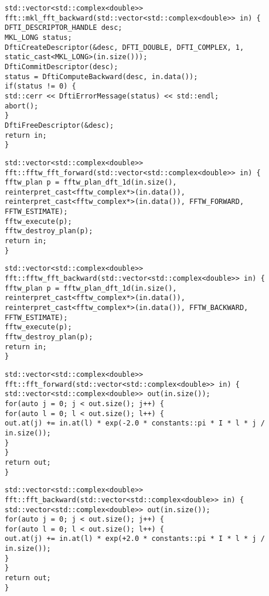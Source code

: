 \begin{lstlisting}[style=CXX, caption=Function performing backward fast Fourier transform using MKL library]
std::vector<std::complex<double>> fft::mkl_fft_backward(std::vector<std::complex<double>> in) {
DFTI_DESCRIPTOR_HANDLE desc;
MKL_LONG status;
DftiCreateDescriptor(&desc, DFTI_DOUBLE, DFTI_COMPLEX, 1, static_cast<MKL_LONG>(in.size()));
DftiCommitDescriptor(desc);
status = DftiComputeBackward(desc, in.data());
if(status != 0) {
std::cerr << DftiErrorMessage(status) << std::endl;
abort();
}
DftiFreeDescriptor(&desc);
return in;
}
\end{lstlisting}

\begin{lstlisting}[style=CXX, caption=Function performing forward fast Fourier transform using FFTW library]
std::vector<std::complex<double>> fft::fftw_fft_forward(std::vector<std::complex<double>> in) {
fftw_plan p = fftw_plan_dft_1d(in.size(), reinterpret_cast<fftw_complex*>(in.data()), reinterpret_cast<fftw_complex*>(in.data()), FFTW_FORWARD, FFTW_ESTIMATE);
fftw_execute(p);
fftw_destroy_plan(p);
return in;
}
\end{lstlisting}

\begin{lstlisting}[style=CXX, caption=Function performing backward fast Fourier transform using FFTW library]
std::vector<std::complex<double>> fft::fftw_fft_backward(std::vector<std::complex<double>> in) {
fftw_plan p = fftw_plan_dft_1d(in.size(), reinterpret_cast<fftw_complex*>(in.data()), reinterpret_cast<fftw_complex*>(in.data()), FFTW_BACKWARD, FFTW_ESTIMATE);
fftw_execute(p);
fftw_destroy_plan(p);
return in;
}
\end{lstlisting}

\begin{lstlisting}[style=CXX, caption=Function performing forward discrete Fourier transform without using any library]
std::vector<std::complex<double>> fft::fft_forward(std::vector<std::complex<double>> in) {
std::vector<std::complex<double>> out(in.size());
for(auto j = 0; j < out.size(); j++) {
for(auto l = 0; l < out.size(); l++) {
out.at(j) += in.at(l) * exp(-2.0 * constants::pi * I * l * j / in.size());
}
}
return out;
}
\end{lstlisting}

\begin{lstlisting}[style=CXX, caption=Function performing backward discrete Fourier transform without using any library]
std::vector<std::complex<double>> fft::fft_backward(std::vector<std::complex<double>> in) {
std::vector<std::complex<double>> out(in.size());
for(auto j = 0; j < out.size(); j++) {
for(auto l = 0; l < out.size(); l++) {
out.at(j) += in.at(l) * exp(+2.0 * constants::pi * I * l * j / in.size());
}
}
return out;
}
\end{lstlisting}


